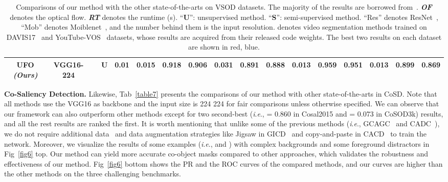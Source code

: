 \documentclass[journal]{IEEEtran}
\newcommand{\ie}{\textit{i}.\textit{e}., }
\begin{document}
\begin{table*}[t]
\begin{center}
{\begin{tabular}{c|c|c|c|c|ccc|ccc|ccc|ccc}
				
				\textbf{UFO \textit{(Ours)}} & VGG16-224 & \ding{52} & U & 0.01 & \textbf{{\color{red} 0.015}} & \textbf{{\color{blue}0.918}}  & \textbf{{\color{blue}0.906}}  & \textbf{{\color{blue}0.031}} & \textbf{{\color{blue}0.891}} & \textbf{{\color{blue}0.888}}  & \textbf{{\color{blue}0.013}} & \textbf{{\color{red}0.959}}  & \textbf{{\color{red}0.951}} & \textbf{{\color{red}0.013}} & \textbf{{\color{red}0.899}} & \textbf{{\color{red}0.869}}\\
				\bottomrule \end{tabular}}    
\end{center}\caption{{Comparisons of our method with the other state-of-the-arts on VSOD datasets. The majority of the results are borrowed from~\cite{ji2021full}. \textbf{\textit{OF}} denotes the optical flow. \textbf{\textit{RT}} denotes the runtime (s). “\textbf{U}”: unsupervised method. “\textbf{S}”: semi-supervised method. “Res” denotes ResNet~\cite{he2016deep}, “Mob” denotes Moiblenet~\cite{howard2019searching}, and the number behind them is the input resolution. 
 denotes video segmentation methods trained on DAVIS17~\cite{pont20172017} and YouTube-VOS~\cite{xu2018youtube} datasets, whose results are acquired from their released code weights.
The best two results on each dataset are shown in {\color{red} red}, {\color{blue} blue}.}}\label{table8}
\end{table*}


\noindent \textbf{Co-Saliency Detection.} Likewise, Tab~\ref{table7} presents the comparisons of our method with other state-of-the-arts in CoSD. Note that all methods use the VGG16 as backbone and the input size is 224  224 for fair comparisons unless otherwise specified. We can observe that our framework can also outperform other methods except for two second-best (\ie  = 0.860 in Cosal2015 and  = 0.073 in CoSOD3k) results, and all the rest results are ranked the first.
It is worth mentioning that unlike some of the previous methods (\ie GCAGC~\cite{zhang2020adaptive} and CADC~\cite{zhang2021summarize}), we do not require additional data~\cite{wang2017learning,liu2010learning} and data augmentation strategies like Jigsaw in GICD~\cite{zhang2020gradient} and copy-and-paste in CACD~\cite{zhang2021summarize} to train the network. Moreover, we visualize the results of some examples (\ie  and ) with complex backgrounds and some foreground distractors in Fig~\ref{fig6} top. Our method can yield more accurate co-object masks compared to other approaches, which validates the robustness and effectiveness of our method. Fig~\ref{fig6} bottom shows the PR and the ROC curves of the compared methods, and our curves are higher than the other methods on the three challenging benchmarks.
\end{document}
